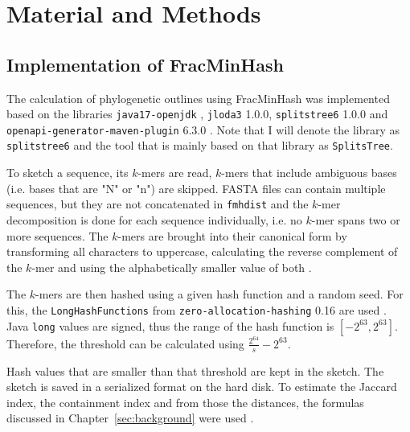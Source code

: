 
\chapter{Material and Methods}
  \label{sec:matmet}

\section{Implementation of FracMinHash}
The calculation of phylogenetic outlines using FracMinHash was implemented based
on the libraries \texttt{java17-openjdk} \cite{theopenjdkcommunityJDK172021},
\texttt{jloda3} 1.0.0, \texttt{splitstree6} 1.0.0
\cite{husonApplicationPhylogeneticNetworks2006} and
\texttt{openapi-generator-maven-plugin} 6.3.0
\cite{openapi-generatorcontributorsOpenAPIGenerator2023}. Note that I will
denote the library as \texttt{splitstree6} and the tool that is mainly based on
that library as \texttt{SplitsTree}.

To sketch a sequence, its $k$-mers are read, $k$-mers that include ambiguous
bases (i.e. bases that are "N" or "n") are skipped. FASTA files can contain
multiple sequences, but they are not concatenated in \texttt{fmhdist} and the
$k$-mer decomposition is done for each sequence individually, i.e. no $k$-mer
spans two or more sequences. The $k$-mers are brought into their canonical form
by transforming all characters to uppercase, calculating the reverse complement
of the $k$-mer and using the alphabetically smaller value of both
\cite{ondovMashFastGenome2016,irberLightweightCompositionalAnalysis2022} .

The $k$-mers are then hashed using a given hash function and a random seed. For
this, the \texttt{LongHashFunctions} from \texttt{zero-allocation-hashing} 0.16
are used \cite{ZeroAllocationHashing2022}. Java \texttt{long} values are signed,
thus the range of the hash function is $[-2^{63}, 2^{63}]$. Therefore, the
threshold can be calculated using $\frac{2^{64}}{s} -2^{63}$. 

Hash values that are smaller than that threshold are kept in the sketch. The
sketch is saved in a serialized format on the hard disk. To estimate the Jaccard
index, the containment index and from those the distances, the formulas
discussed in Chapter~\ref{sec:background} were used
\cite{heraDerivingConfidenceIntervals2023,irberLightweightCompositionalAnalysis2022}.

